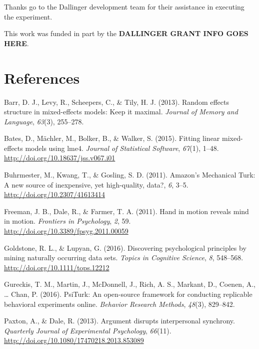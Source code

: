 \documentclass[10pt, letterpaper]{article}
\begin{document}
Thanks go to the Dallinger development team for their assistance in
executing the experiment.

This work was funded in part by the \textbf{DALLINGER GRANT INFO GOES
HERE}.

\section{References}\label{references}

\setlength{\parindent}{-0.1in} \setlength{\leftskip}{0.125in} \noindent

\hypertarget{refs}{}
\hypertarget{ref-barr2013random}{}
Barr, D. J., Levy, R., Scheepers, C., \& Tily, H. J. (2013). Random
effects structure in mixed-effects models: Keep it maximal.
\emph{Journal of Memory and Language}, \emph{63}(3), 255--278.

\hypertarget{ref-bates2015fitting}{}
Bates, D., Mächler, M., Bolker, B., \& Walker, S. (2015). Fitting linear
mixed-effects models using lme4. \emph{Journal of Statistical Software},
\emph{67}(1), 1--48. \url{http://doi.org/10.18637/jss.v067.i01}

\hypertarget{ref-buhrmester2011amazon}{}
Buhrmester, M., Kwang, T., \& Gosling, S. D. (2011). Amazon's Mechanical
Turk: A new source of inexpensive, yet high-quality, data?, \emph{6},
3--5. \url{http://doi.org/10.2307/41613414}

\hypertarget{ref-freeman2011hand}{}
Freeman, J. B., Dale, R., \& Farmer, T. A. (2011). Hand in motion
reveals mind in motion. \emph{Frontiers in Psychology}, \emph{2}, 59.
\url{http://doi.org/10.3389/fpsyg.2011.00059}

\hypertarget{ref-goldstone2016discovering}{}
Goldstone, R. L., \& Lupyan, G. (2016). Discovering psychological
principles by mining naturally occurring data sets. \emph{Topics in
Cognitive Science}, \emph{8}, 548--568.
\url{http://doi.org/10.1111/tops.12212}

\hypertarget{ref-gureckis2016psiturk}{}
Gureckis, T. M., Martin, J., McDonnell, J., Rich, A. S., Markant, D.,
Coenen, A., \ldots{} Chan, P. (2016). PsiTurk: An open-source framework
for conducting replicable behavioral experiments online. \emph{Behavior
Research Methods}, \emph{48}(3), 829--842.

\hypertarget{ref-paxton2013argument}{}
Paxton, A., \& Dale, R. (2013). Argument disrupts interpersonal
synchrony. \emph{Quarterly Journal of Experimental Psychology},
\emph{66}(11). \url{http://doi.org/10.1080/17470218.2013.853089}
\end{document}

